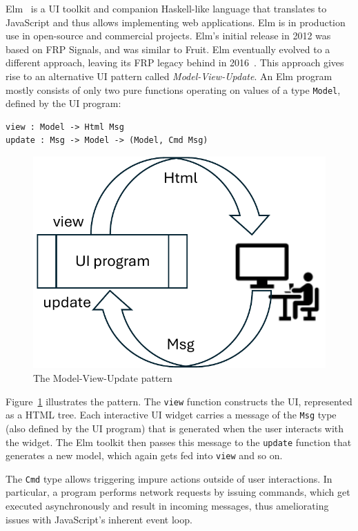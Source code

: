 \documentclass[sigplan,review,screen]{acmart}
\begin{document}
Elm~\cite{Elm} is a UI toolkit and companion Haskell-like language
that translates to JavaScript and thus allows implementing web
applications.  Elm is in production use in open-source and
commercial projects.  Elm's initial release in 2012 was based on FRP Signals,
and was similar to Fruit.  
Elm eventually evolved to a different approach,
leaving its FRP legacy behind in 2016~\cite{ElmFarewellFRP}.  This approach
gives rise to an alternative UI pattern called
\textit{Model-View-Update}.  An Elm program mostly consists of only
two pure functions operating on values of a type \texttt{Model},
defined by the UI program:
%
\begin{verbatim}
view : Model -> Html Msg
update : Msg -> Model -> (Model, Cmd Msg)
\end{verbatim}
%
\begin{figure}
  \centering
  \includegraphics[width=0.6\columnwidth]{model-view-update}
  \caption{The Model-View-Update pattern}
  \label{fig:mvu}
\end{figure}
%
Figure~\ref{fig:mvu} illustrates the pattern.
The \texttt{view} function constructs the UI, represented as a HTML
tree.  Each interactive UI widget carries a message of the
\texttt{Msg} type (also defined by the UI program) that is generated
when the user interacts with the widget.  The Elm toolkit then passes
this message to the \texttt{update} function that generates a new
model, which again gets fed into \texttt{view} and so on.

The \texttt{Cmd} type allows triggering impure actions outside of user
interactions.  In particular, a program performs network requests by
issuing commands, which get executed asynchronously and result in
incoming messages, thus ameliorating issues with JavaScript's
inherent event loop.
\end{document}

